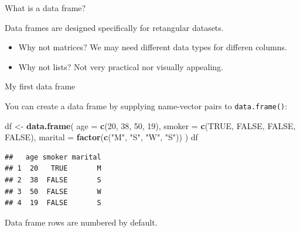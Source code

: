\documentclass[ignorenonframetext,]{beamer}
\newenvironment{Shaded}{\begin{snugshade}}{\end{snugshade}}
\newcommand{\DataTypeTok}[1]{\textcolor[rgb]{0.13,0.29,0.53}{#1}}
\newcommand{\DecValTok}[1]{\textcolor[rgb]{0.00,0.00,0.81}{#1}}
\newcommand{\KeywordTok}[1]{\textcolor[rgb]{0.13,0.29,0.53}{\textbf{#1}}}
\newcommand{\NormalTok}[1]{#1}
\newcommand{\OtherTok}[1]{\textcolor[rgb]{0.56,0.35,0.01}{#1}}
\newcommand{\StringTok}[1]{\textcolor[rgb]{0.31,0.60,0.02}{#1}}
\begin{document}
\begin{frame}{What is a data frame?}
\protect\hypertarget{what-is-a-data-frame}{}

Data frames are designed specifically for retangular datasets.

\begin{itemize}
\item
  Why not matrices? We may need different data types for differen
  columns.
\item
  Why not lists? Not very practical nor visually appealing.
\end{itemize}

\end{frame}

\begin{frame}[fragile]{My first data frame}
\protect\hypertarget{my-first-data-frame}{}

You can create a data frame by supplying name-vector pairs to
\texttt{data.frame()}:

\begin{Shaded}
\begin{Highlighting}[]
\NormalTok{df <-}\StringTok{ }\KeywordTok{data.frame}\NormalTok{(}
\DataTypeTok{age =} \KeywordTok{c}\NormalTok{(}\DecValTok{20}\NormalTok{, }\DecValTok{38}\NormalTok{, }\DecValTok{50}\NormalTok{, }\DecValTok{19}\NormalTok{),}
\DataTypeTok{smoker =} \KeywordTok{c}\NormalTok{(}\OtherTok{TRUE}\NormalTok{, }\OtherTok{FALSE}\NormalTok{, }\OtherTok{FALSE}\NormalTok{, }\OtherTok{FALSE}\NormalTok{),}
\DataTypeTok{marital =} \KeywordTok{factor}\NormalTok{(}\KeywordTok{c}\NormalTok{(}\StringTok{"M"}\NormalTok{, }\StringTok{"S"}\NormalTok{, }\StringTok{"W"}\NormalTok{, }\StringTok{"S"}\NormalTok{))}
\NormalTok{)}
\NormalTok{df}
\end{Highlighting}
\end{Shaded}

\begin{verbatim}
##   age smoker marital
## 1  20   TRUE       M
## 2  38  FALSE       S
## 3  50  FALSE       W
## 4  19  FALSE       S
\end{verbatim}

Data frame rows are numbered by default.

\end{frame}
\end{document}
